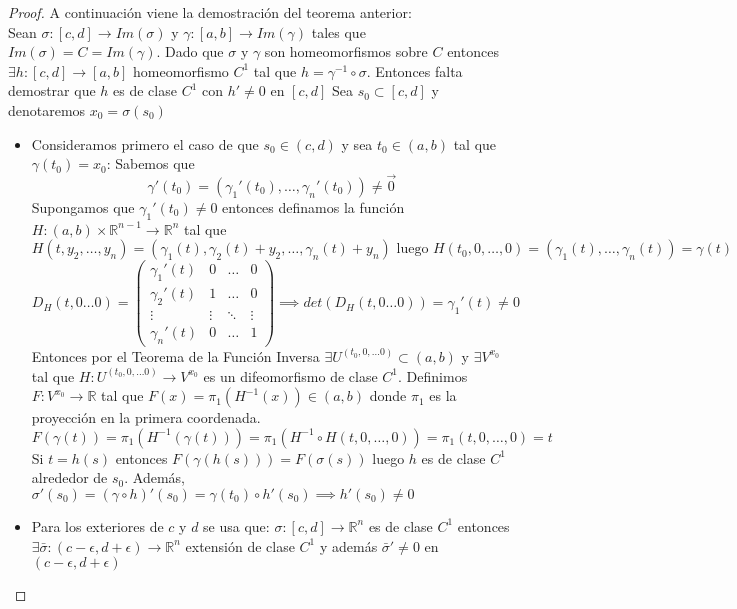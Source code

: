 \begin{proof}
    A continuación viene la demostración del teorema anterior: \\
    Sean $\sigma: [c,d] \to Im(\sigma)$ y $\gamma: [a,b] \to Im(\gamma)$ tales que $Im(\sigma) = C = Im(\gamma)$.
    Dado que $\sigma$ y $\gamma$ son homeomorfismos sobre $C$ entonces $\exists h: [c,d] \to [a,b]$ homeomorfismo $C^1$ tal que $h = \gamma^{-1} \circ \sigma$.
    Entonces falta demostrar que $h$ es de clase $C^1$ con $h' \neq 0$ en $[c,d]$
    Sea $s_0 \subset [c,d]$ y denotaremos $x_0 = \sigma(s_0)$
    \begin{itemize}
        \item     Consideramos primero el caso de que $s_0 \in (c,d)$ y sea $t_0 \in (a, b)$ tal
              que $\gamma(t_0) = x_0$: Sabemos que $$\gamma'(t_0) = (\gamma_1'(t_0), \ldots,
                  \gamma_n'(t_0)) \neq \vec{0}$$ Supongamos que $\gamma_1'(t_0) \neq 0$ entonces
              definamos la función $H: (a, b) \times \mathbb{R}^{n-1} \to \mathbb{R}^{n}$ tal
              que $$H(t, y_2, \ldots, y_n) = (\gamma_1(t), \gamma_2(t) + y_2, \ldots,
                  \gamma_n(t) + y_n) \text{ luego } H(t_0, 0, \ldots, 0) = (\gamma_1(t), \ldots,
                  \gamma_n(t)) = \gamma(t)$$ $$D_H(t, 0 \ldots 0) = \left(
                  \begin{array}{c|ccc}
                          \gamma_1'(t) & 0      & \ldots & 0      \\
                          \hline
                          \gamma_2'(t) & 1      & \ldots & 0      \\
                          \vdots       & \vdots & \ddots & \vdots \\
                          \gamma_n'(t) & 0      & \ldots & 1
                      \end{array}
                  \right) \implies det(D_H(t, 0 \ldots 0)) = \gamma_1'(t) \neq 0$$
              Entonces por el Teorema de la Función Inversa $\exists U^{(t_0, 0, \ldots 0)} \subset (a, b)$ y $\exists V^{x_0}$ tal que $H: U^{(t_0, 0, \ldots 0)} \to V^{x_0}$ es un difeomorfismo de clase $C^1$. Definimos $F: V^{x_0} \to \mathbb{R}$ tal que $F(x) = \pi_1(H^{-1}(x)) \in (a,b)$ donde $\pi_1$ es la proyección en la primera coordenada. \\
              $$F(\gamma(t)) = \pi_1(H^{-1}(\gamma(t))) = \pi_1(H^{-1} \circ H(t, 0, \ldots, 0)) = \pi_1(t, 0, \ldots, 0) = t$$
              Si $t = h(s)$ entonces $F(\gamma(h(s))) = F(\sigma(s))$ luego $h$ es de clase $C^1$ alrededor de $s_0$. Además, $\sigma'(s_0) = (\gamma \circ h)'(s_0) = \gamma(t_0) \circ h'(s_0) \implies h'(s_0) \neq 0$ \\
        \item Para los exteriores de $c$ y $d$ se usa que: $\sigma: [c,d] \to \mathbb{R}^n$
              es de clase $C^1$ entonces $\exists \bar{\sigma}: (c - \epsilon, d + \epsilon)
                  \to \mathbb{R}^n$ extensión de clase $C^1$ y además $\bar{\sigma}' \neq 0$ en
              $(c - \epsilon, d + \epsilon)$
    \end{itemize}
\end{proof}

